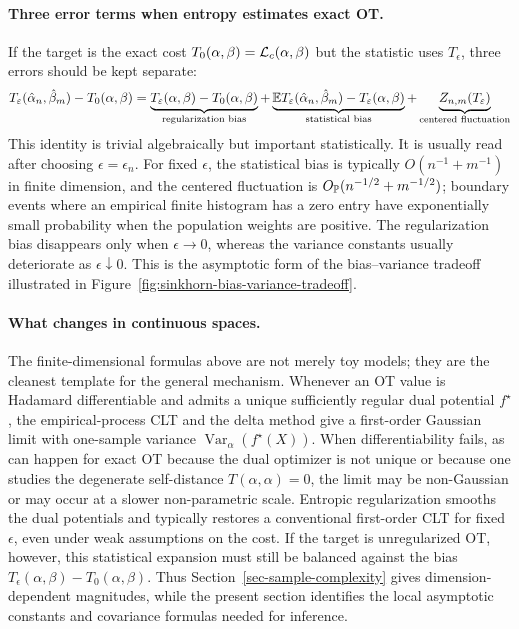 \paragraph{Three error terms when entropy estimates exact OT.}
If the target is the exact cost \(T_0(\alpha,\beta)=\mathcal{L}_c(\alpha,\beta)\) but the statistic uses \(T_\epsilon\), three errors should be kept separate:
\[
	T_\varepsilon(\hat\alpha_n,\hat\beta_m)-T_0(\alpha,\beta)
	=
	\underbrace{T_\varepsilon(\alpha,\beta)-T_0(\alpha,\beta)}_{\text{regularization bias}}
	+
	\underbrace{\mathbb{E} T_\varepsilon(\hat\alpha_n,\hat\beta_m)-T_\varepsilon(\alpha,\beta)}_{\text{statistical bias}}
	+
	\underbrace{Z_{n,m}(T_\varepsilon)}_{\text{centered fluctuation}}
\]
This identity is trivial algebraically but important statistically.  It is usually read after choosing \(\epsilon=\epsilon_n\).  For fixed \(\epsilon\), the statistical bias is typically \(O(n^{-1}+m^{-1})\) in finite dimension, and the centered fluctuation is \(O_{\mathbb{P}}(n^{-1/2}+m^{-1/2})\); boundary events where an empirical finite histogram has a zero entry have exponentially small probability when the population weights are positive.  The regularization bias disappears only when \(\epsilon\to0\), whereas the variance constants usually deteriorate as \(\epsilon\downarrow0\).  This is the asymptotic form of the bias--variance tradeoff illustrated in Figure~\ref{fig:sinkhorn-bias-variance-tradeoff}.

\paragraph{What changes in continuous spaces.}
The finite-dimensional formulas above are not merely toy models; they are the cleanest template for the general mechanism.  Whenever an OT value is Hadamard differentiable and admits a unique sufficiently regular dual potential \(f^\star\), the empirical-process CLT and the delta method give a first-order Gaussian limit with one-sample variance \(\operatorname{Var}_\alpha(f^\star(X))\).  When differentiability fails, as can happen for exact OT because the dual optimizer is not unique or because one studies the degenerate self-distance \(T(\alpha,\alpha)=0\), the limit may be non-Gaussian or may occur at a slower non-parametric scale.  Entropic regularization smooths the dual potentials and typically restores a conventional first-order CLT for fixed \(\epsilon\), even under weak assumptions on the cost.  If the target is unregularized OT, however, this statistical expansion must still be balanced against the bias \(T_\epsilon(\alpha,\beta)-T_0(\alpha,\beta)\).  Thus Section~\ref{sec-sample-complexity} gives dimension-dependent magnitudes, while the present section identifies the local asymptotic constants and covariance formulas needed for inference.
